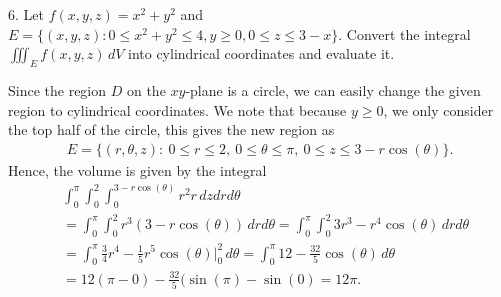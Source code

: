 \documentclass{report}
\begin{document}
    \bigbreak \noindent 
    \begin{mdframed}
        6. Let \(f(x, y, z) = x^2 + y^2\) and \(E = \{(x, y, z) : 0 \leq x^2 + y^2 \leq 4, y \geq 0, 0 \leq z \leq 3 - x\}\). Convert the integral \(\iiint_E f(x, y, z) \, dV\) into cylindrical coordinates and evaluate it.
    \end{mdframed}
    \bigbreak \noindent 
    Since the region $D$ on the $xy$-plane is a circle, we can easily change the given region to cylindrical coordinates. We note that because $y \geq 0$, we only consider the top half of the circle, this gives the new region as
    \begin{align*}
        E = \{(r,\theta ,z):\ 0 \leq r \leq 2,\ 0 \leq \theta \leq \pi,\ 0 \leq z \leq 3-r\cos{\left(\theta \right)} \}
    .\end{align*}
    Hence, the volume is given by the integral
    \begin{align*}
        &\int_{0}^{\pi }\int_{0}^{2}\int_{0}^{3-r\cos{\left(\theta \right)}}  r^{2}r\, dzdrd\theta  \\
        &=\int_{0}^{\pi }\int_{0}^{2} r^{3}(3-r\cos{\left(\theta \right)}) \, drd\theta  = \int_{0}^{\pi}\int_{0}^{2} 3r^{3}-r^{4}\cos{\left(\theta \right)} \, drd\theta  \\
        &=\int_{0}^{\pi } \frac{3}{4}r^{4} - \frac{1}{5}r^{5}\cos{\left(\theta \right)}\bigg|_{0}^{2} \, d\theta = \int_{0}^{\pi}  12 - \frac{32}{5}\cos{\left(\theta \right)}\, d\theta  \\
        &= 12(\pi - 0) - \frac{32}{5}(\sin{\left(\pi\right)} - \sin{\left(0\right)} = 12\pi
    .\end{align*}
    
\end{document}
